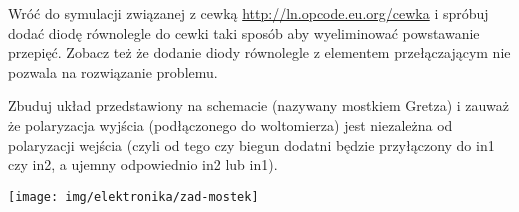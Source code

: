 % 
% 
% 
% 


\dbEntryCheckResults
Wróć do symulacji związanej z cewką \url{http://ln.opcode.eu.org/cewka} i spróbuj dodać diodę równolegle do cewki taki sposób aby wyeliminować powstawanie przepięć.
Zobacz też że dodanie diody równolegle z elementem przełączającym nie pozwala na rozwiązanie problemu.
\fi

\dbEntryCheckResults
\noindent\begin{minipage}[b]{0.6\textwidth}
Zbuduj układ przedstawiony na schemacie (nazywany mostkiem Gretza) i zauważ że polaryzacja wyjścia (podłączonego do woltomierza) jest niezależna od polaryzacji wejścia (czyli od tego czy biegun dodatni będzie przyłączony do in1 czy in2, a ujemny odpowiednio in2 lub in1).
\end{minipage}
\hfill
\begin{minipage}[b]{0.35\textwidth}
\texttt{[image: img/elektronika/zad-mostek]}
\end{minipage}
\fi


